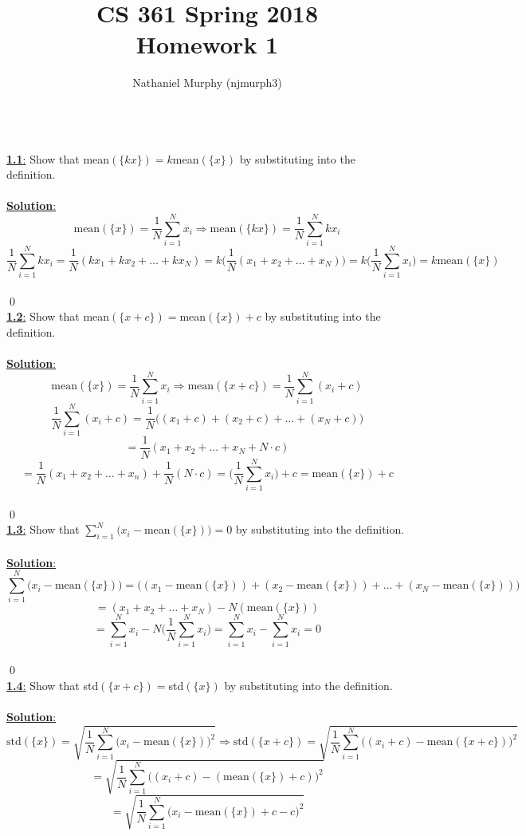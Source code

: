 \documentclass[11pt]{article}
\title{\textbf{CS 361 Spring 2018\\Homework 1}}
\author{Nathaniel Murphy (njmurph3)}
\date{}
\begin{document}
\maketitle
\ \\
\underline{\textbf{1.1}:} Show that mean$(\{kx\})=k$mean$(\{x\})$ by substituting into the definition. \\ \\
\underline{\textbf{Solution}:}
\[\text{mean}(\{x\})=\frac{1}{N}\sum_{i=1}^Nx_i\Rightarrow\text{mean}(\{kx\})=\frac{1}{N}\sum_{i=1}^Nkx_i\]
\[\frac{1}{N}\sum_{i=1}^Nkx_i=\frac{1}{N}(kx_1+kx_2+\ldots+kx_N)=k\Big(\frac{1}{N}(x_1+x_2+\ldots+x_N)\Big)=k\Big(\frac{1}{N}\sum_{i=1}^Nx_i\Big)=k\text{mean}(\{x\})\] \\ \qed
\\[30mm]
\underline{\textbf{1.2}:} Show that mean$(\{x+c\})=$mean$(\{x\})+c$ by substituting into the definition. \\ \\
\underline{\textbf{Solution}:}
\[\text{mean}(\{x\})=\frac{1}{N}\sum_{i=1}^Nx_i\Rightarrow\text{mean}(\{x+c\})=\frac{1}{N}\sum_{i=1}^N(x_i+c)\]
\[\frac{1}{N}\sum_{i=1}^N(x_i+c)=\frac{1}{N}\big((x_1+c)+(x_2+c)+\ldots+(x_N+c)\big)\]
\[=\frac{1}{N}(x_1+x_2+\ldots+x_N+N\cdot c)\]
\[=\frac{1}{N}(x_1+x_2+\ldots+x_n)+\frac{1}{N}(N\cdot c)=\Bigg(\frac{1}{N}\sum_{i=1}^Nx_i\Bigg) + c=\text{mean}(\{x\})+c\] \\ \qed
\newpage
\ \\
\underline{\textbf{1.3}:} Show that $\sum_{i=1}^N(x_i-$mean$(\{x\}))=0$ by substituting into the definition. \\ \\
\underline{\textbf{Solution}:}
\[\sum_{i=1}^N\Big(x_i-\text{mean}(\{x\})\Big)=\big((x_1-\text{mean}(\{x\}))+(x_2-\text{mean}(\{x\}))+\ldots+(x_N-\text{mean}(\{x\}))\big)\]
\[=(x_1+x_2+\ldots+x_N)-N(\text{mean}(\{x\}))\]
\[=\sum_{i=1}^Nx_i-N\Big(\frac{1}{N}\sum_{i=1}^Nx_i\Big)=\sum_{i=1}^Nx_i-\sum_{i=1}^Nx_i=0\] \\ \qed
\\[30mm]
\underline{\textbf{1.4}:} Show that std$(\{x+c\})=$std$(\{x\})$ by substituting into the definition. \\ \\
\underline{\textbf{Solution}:}
\[\text{std}(\{x\})=\sqrt{\frac{1}{N}\sum_{i=1}^N\big(x_i-\text{mean}(\{x\})\big)^2}\Rightarrow\text{std}(\{x+c\})=\sqrt{\frac{1}{N}\sum_{i=1}^N\Big((x_i+c)-\text{mean}(\{x+c\})\Big)^2}\]
\[=\sqrt{\frac{1}{N}\sum_{i=1}^N\Big((x_i+c)-(\text{mean}(\{x\})+c)\Big)^2}\]
\[=\sqrt{\frac{1}{N}\sum_{i=1}^N\Big(x_i-\text{mean}(\{x\})+c-c\Big)^2}\]
\end{document}
